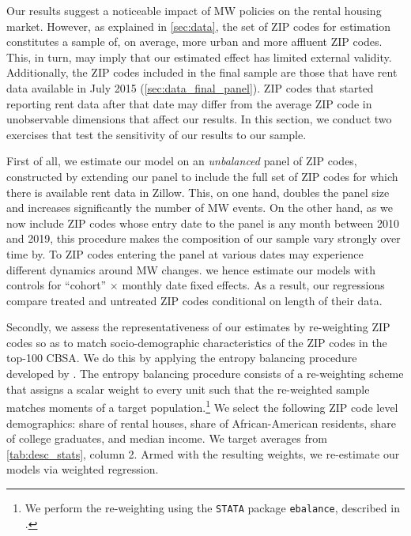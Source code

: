 Our results suggest a noticeable impact of MW policies on the rental housing market. However, as 
explained in \autoref{sec:data}, the set of ZIP codes for estimation constitutes a sample of, on 
average, more urban and more affluent ZIP codes. This, in turn, may imply that our estimated effect has 
limited external validity. Additionally, the ZIP codes included in the final sample are those that 
have rent data available in July 2015 (\autoref{sec:data_final_panel}). ZIP codes that started reporting rent data after that 
date may differ from the average ZIP code in unobservable dimensions that affect our results. 
In this section, we conduct two exercises that test the sensitivity of our results to our sample.

First of all, we estimate our model on an \textit{unbalanced} panel of ZIP codes, constructed by 
extending our panel to include the full set of ZIP codes for which there is available rent data in 
Zillow. This, on one hand, doubles the panel size and increases significantly the number of MW 
events. %
On the other hand, as we now include ZIP codes whose entry date to the panel is any month between
2010 and 2019, this procedure makes the composition of our sample vary strongly over time by. To 
ZIP codes entering the panel at various dates may experience different dynamics around MW changes.  
we hence estimate our models with controls for ``cohort'' $\times$ monthly date fixed effects. 
As a result, our regressions compare treated and untreated ZIP codes conditional on length of their 
data.

Secondly, we assess the representativeness of our estimates by re-weighting ZIP codes so as to match 
socio-demographic characteristics of the ZIP codes in the top-100 CBSA. We do this by applying the 
entropy balancing procedure developed by \cite{hainmueller2012entropy}. 
The entropy balancing procedure consists of a re-weighting scheme that assigns a scalar 
weight to every unit such that the re-weighted sample matches moments of a target population.\footnote{We 
	perform the re-weighting using the \texttt{STATA} package \texttt{ebalance}, described in 
	\textcite{hainmueller2013ebalance}.} We select the following ZIP code 
level demographics: share of rental houses, share of African-American residents, share of college 
graduates, and median income. We target averages from \autoref{tab:desc_stats}, column 
2. Armed with the resulting weights, we re-estimate our models via weighted regression.

